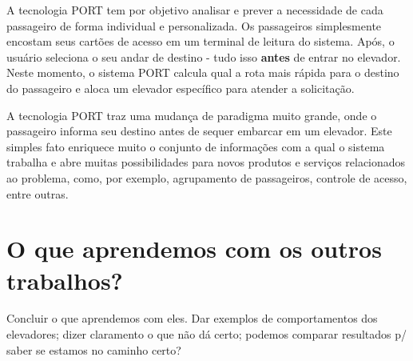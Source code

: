 A tecnologia PORT tem por objetivo analisar e prever a necessidade de cada
passageiro de forma individual e personalizada. Os passageiros simplesmente
encostam seus cartões de acesso em um terminal de leitura do sistema. Após, o
usuário seleciona o seu andar de destino - tudo isso \textbf{antes} de entrar no
elevador. Neste momento, o sistema PORT calcula qual a rota mais rápida para o
destino do passageiro e aloca um elevador específico para atender a solicitação.

A tecnologia PORT traz uma mudança de paradigma muito grande, onde o passageiro
informa seu destino antes de sequer embarcar em um elevador. Este simples fato
enriquece muito o conjunto de informações com a qual o sistema trabalha e abre
muitas possibilidades para novos produtos e serviços relacionados ao problema,
como, por exemplo, agrupamento de passageiros, controle de acesso, entre outras.

\section{\label{section:aprendemos}O que aprendemos com os outros trabalhos?}

{\color{red}Concluir o que aprendemos com eles. Dar exemplos de comportamentos dos elevadores; dizer claramento o que não dá certo; podemos comparar resultados p/ saber se estamos no caminho certo?}